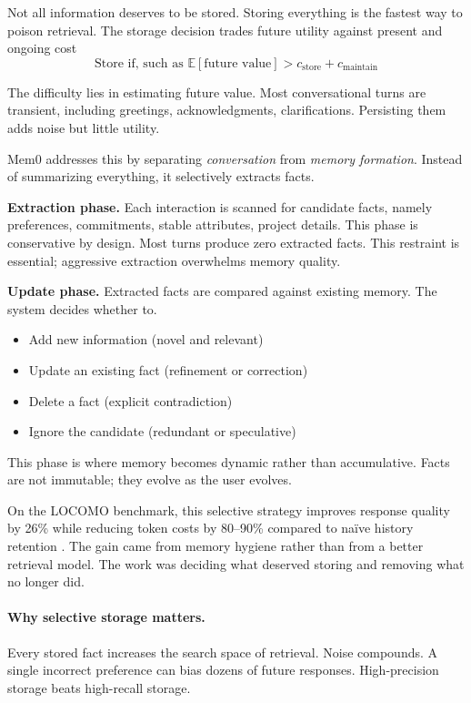 Not all information deserves to be stored. Storing everything is the fastest way to poison retrieval. The storage decision trades future utility against present and ongoing cost
\[
\text{Store if, such as } \mathbb{E}[\text{future value}] > c_{\text{store}} + c_{\text{maintain}}
\]

The difficulty lies in estimating future value. Most conversational turns are transient, including greetings, acknowledgments, clarifications. Persisting them adds noise but little utility.

Mem0 \cite{mem0_2025} addresses this by separating \emph{conversation} from \emph{memory formation}. Instead of summarizing everything, it selectively extracts facts.

\textbf{Extraction phase.}
Each interaction is scanned for candidate facts, namely preferences, commitments, stable attributes, project details. This phase is conservative by design. Most turns produce zero extracted facts. This restraint is essential; aggressive extraction overwhelms memory quality.

\textbf{Update phase.}
Extracted facts are compared against existing memory. The system decides whether to.
\begin{itemize}
\item Add new information (novel and relevant)
\item Update an existing fact (refinement or correction)
\item Delete a fact (explicit contradiction)
\item Ignore the candidate (redundant or speculative)
\end{itemize}

This phase is where memory becomes dynamic rather than accumulative. Facts are not immutable; they evolve as the user evolves.

On the LOCOMO benchmark, this selective strategy improves response quality by 26\% while reducing token costs by 80--90\% compared to naïve history retention \cite{mem0_2025}. The gain came from memory hygiene rather than from a better retrieval model. The work was deciding what deserved storing and removing what no longer did.

\paragraph{Why selective storage matters.}
Every stored fact increases the search space of retrieval. Noise compounds. A single incorrect preference can bias dozens of future responses. High-precision storage beats high-recall storage.

